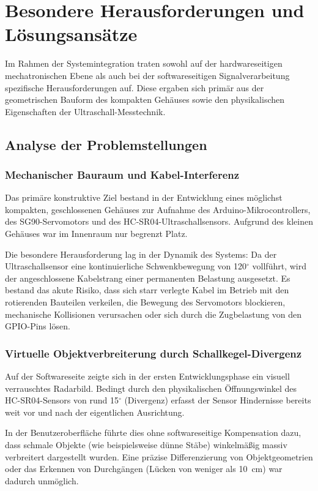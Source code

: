 \chapter{Besondere Herausforderungen und Lösungsansätze}
\label{chap:Besondere_Herausforderungen}

Im Rahmen der Systemintegration traten sowohl auf der hardwareseitigen mechatronischen Ebene als auch bei der softwareseitigen Signalverarbeitung spezifische Herausforderungen auf. Diese ergaben sich primär aus der geometrischen Bauform des kompakten Gehäuses sowie den physikalischen Eigenschaften der Ultraschall-Messtechnik.

\section{Analyse der Problemstellungen}
\label{sec:Analyse_Herausforderungen}

\subsection{Mechanischer Bauraum und Kabel-Interferenz}
Das primäre konstruktive Ziel bestand in der Entwicklung eines möglichst kompakten, geschlossenen Gehäuses zur Aufnahme des Arduino-Mikrocontrollers, des SG90-Servomotors und des HC-SR04-Ultraschallsensors. Aufgrund des kleinen Gehäuses war im Innenraum nur begrenzt Platz. 

Die besondere Herausforderung lag in der Dynamik des Systems: Da der Ultraschallsensor eine kontinuierliche Schwenkbewegung von 120$^\circ$ vollführt, wird der angeschlossene Kabelstrang einer permanenten Belastung ausgesetzt. Es bestand das akute Risiko, dass sich starr verlegte Kabel im Betrieb mit den rotierenden Bauteilen verkeilen, die Bewegung des Servomotors blockieren, mechanische Kollisionen verursachen oder sich durch die Zugbelastung von den GPIO-Pins lösen.

\subsection{Virtuelle Objektverbreiterung durch Schallkegel-Divergenz}
Auf der Softwareseite zeigte sich in der ersten Entwicklungsphase ein visuell verrauschtes Radarbild. Bedingt durch den physikalischen Öffnungswinkel des HC-SR04-Sensors von rund 15$^\circ$ (Divergenz) erfasst der Sensor Hindernisse bereits weit vor und nach der eigentlichen Ausrichtung. 

In der Benutzeroberfläche führte dies ohne softwareseitige Kompensation dazu, dass schmale Objekte (wie beispielsweise dünne Stäbe) winkelmä\ss ig massiv verbreitert  dargestellt wurden. Eine präzise Differenzierung von Objektgeometrien oder das Erkennen von Durchgängen (Lücken von weniger als 10~cm) war dadurch unmöglich.

